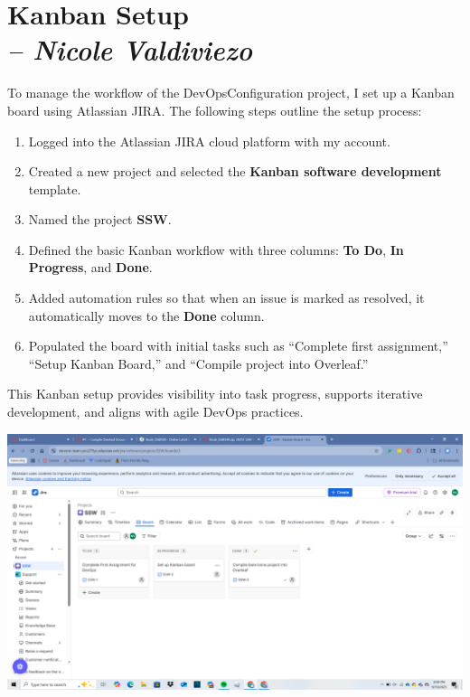 \chapter{Kanban Setup \\
\small{\textit{-- Nicole Valdiviezo}}
\label{Chapter::Kanban Setup}}

To manage the workflow of the DevOpsConfiguration project, I set up a Kanban board using Atlassian JIRA. The following steps outline the setup process:

\begin{enumerate}
    \item  Logged into the Atlassian JIRA cloud platform with my account.
    \item Created a new project and selected the \textbf{Kanban software development} template.
    \item Named the project \textbf{SSW}.
    \item Defined the basic Kanban workflow with three columns: \textbf{To Do}, \textbf{In Progress}, and \textbf{Done}.
    \item Added automation rules so that when an issue is marked as resolved, it automatically moves to the \textbf{Done} column.
    \item Populated the board with initial tasks such as ``Complete first assignment,'' ``Setup Kanban Board,'' and ``Compile project into Overleaf.''
\end{enumerate}

This Kanban setup provides visibility into task progress, supports iterative development, and aligns with agile DevOps practices.


\includegraphics[scale=0.1]{eps/Screenshots/Screenshot (255).png}
